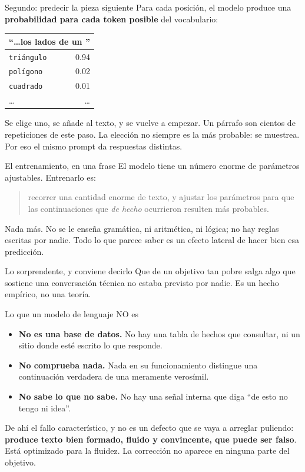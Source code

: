 \documentclass[11pt,aspectratio=169]{beamer}
\begin{document}
\begin{frame}{Segundo: predecir la pieza siguiente}
  Para cada posición, el modelo produce una \textbf{probabilidad para cada
  token posible} del vocabulario:
  \vfill
  \begin{center}
    \begin{tabular}{lr}
      \toprule
      \multicolumn{2}{c}{``\dots los lados de un ''}\\
      \midrule
      \texttt{triángulo}   & 0.94 \\
      \texttt{polígono}    & 0.02 \\
      \texttt{cuadrado}    & 0.01 \\
      \dots                & \dots \\
      \bottomrule
    \end{tabular}
  \end{center}
  \vfill
  Se elige uno, se añade al texto, y se vuelve a empezar. Un párrafo son
  cientos de repeticiones de este paso.
  \vfill
  {\small La elección no siempre es la más probable: se muestrea. Por eso el
   mismo prompt da respuestas distintas.}
\end{frame}

\begin{frame}{El entrenamiento, en una frase}
  El modelo tiene un número enorme de parámetros ajustables. Entrenarlo es:
  \begin{quote}
    recorrer una cantidad enorme de texto, y ajustar los parámetros para que
    las continuaciones que \emph{de hecho} ocurrieron resulten más probables.
  \end{quote}
  \vfill
  Nada más. No se le enseña gramática, ni aritmética, ni lógica; no hay
  reglas escritas por nadie. Todo lo que parece saber es un efecto lateral de
  hacer bien esa predicción.
  \vfill
  \begin{block}{Lo sorprendente, y conviene decirlo}
    Que de un objetivo tan pobre salga algo que sostiene una conversación
    técnica no estaba previsto por nadie. Es un hecho empírico, no una teoría.
  \end{block}
\end{frame}

\begin{frame}{Lo que un modelo de lenguaje NO es}
  \begin{itemize}
    \item \textbf{No es una base de datos.} No hay una tabla de hechos que
          consultar, ni un sitio donde esté escrito lo que responde.
    \item \textbf{No comprueba nada.} Nada en su funcionamiento distingue una
          continuación verdadera de una meramente verosímil.
    \item \textbf{No sabe lo que no sabe.} No hay una señal interna que diga
          ``de esto no tengo ni idea''.
  \end{itemize}
  \vfill
  De ahí el fallo característico, y no es un defecto que se vaya a arreglar
  puliendo: \textbf{produce texto bien formado, fluido y convincente, que puede
  ser falso}. Está optimizado para la fluidez. La corrección no aparece en
  ninguna parte del objetivo.
\end{frame}
\end{document}
